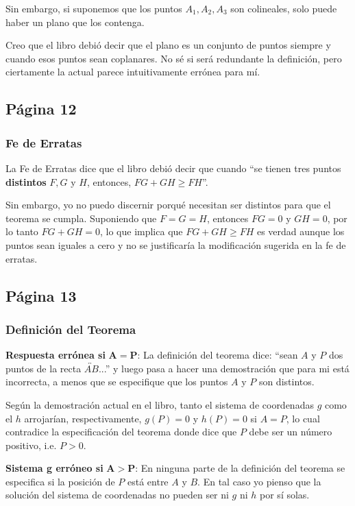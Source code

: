 Sin embargo, si suponemos que los puntos \(A_1,A_2,A_3\) son colineales, solo puede haber un plano que los contenga.

Creo que el libro debió decir que el plano es un conjunto de puntos siempre y cuando esos puntos sean coplanares. No sé si será redundante la definición, pero ciertamente la actual parece intuitivamente errónea para mí.

\subsection{Página 12}

\subsubsection{Fe de Erratas}

La Fe de Erratas dice que el libro debió decir que cuando ``se tienen tres puntos \textbf{distintos} \(F, G\) y \(H\), entonces, \(FG + GH \ge FH\)''. 

Sin embargo, yo no puedo discernir porqué necesitan ser distintos para que el teorema se cumpla. Suponiendo que \(F = G = H\), entonces \(FG =0\) y \(GH = 0\), por lo tanto \(FG + GH = 0\), lo que implica que \(FG + GH \ge FH\) es verdad aunque los puntos sean iguales a cero y no se justificaría la modificación sugerida en la fe de erratas.

\subsection{Página 13}

\subsubsection{Definición del Teorema}

\textbf{Respuesta errónea si} \(\mathbf{A=P}\):
La definición del teorema dice: ``sean \(A\) y \(P\) dos puntos de la recta \(\overleftrightarrow{AB}\)...'' y luego pasa a hacer una demostración que para mi está incorrecta, a menos que se especifique que los puntos \(A\) y \(P\) son distintos.

Según la demostración actual en el libro, tanto el sistema de coordenadas $g$ como el $h$ arrojarían, respectivamente, \(g(P) = 0\) y \(h(P)=0\) si \(A=P\), lo cual contradice la especificación del teorema donde dice que \(P\) debe ser un número positivo, i.e. \(P > 0\).

\textbf{Sistema g erróneo si} \(\mathbf{A>P}\): En ninguna parte de la definición del teorema se especifica si la posición de \(P\) está entre \(A\) y \(B\). En tal caso yo pienso que la solución del sistema de coordenadas no pueden ser ni \(g\) ni \(h\) por sí solas. 

